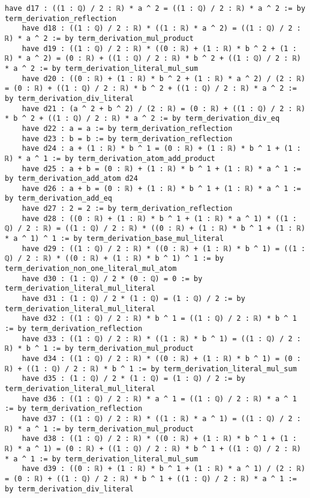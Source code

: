 \documentclass{article}
\begin{document}
\begin{tcolorbox}[colback=white!10, width=\linewidth]
\begin{lstlisting}[language=Lean4]
    have d17 : ((1 : ℚ) / 2 : ℝ) * a ^ 2 = ((1 : ℚ) / 2 : ℝ) * a ^ 2 := by term_derivation_reflection
    have d18 : ((1 : ℚ) / 2 : ℝ) * ((1 : ℝ) * a ^ 2) = ((1 : ℚ) / 2 : ℝ) * a ^ 2 := by term_derivation_mul_product
    have d19 : ((1 : ℚ) / 2 : ℝ) * ((0 : ℝ) + (1 : ℝ) * b ^ 2 + (1 : ℝ) * a ^ 2) = (0 : ℝ) + ((1 : ℚ) / 2 : ℝ) * b ^ 2 + ((1 : ℚ) / 2 : ℝ) * a ^ 2 := by term_derivation_literal_mul_sum
    have d20 : ((0 : ℝ) + (1 : ℝ) * b ^ 2 + (1 : ℝ) * a ^ 2) / (2 : ℝ) = (0 : ℝ) + ((1 : ℚ) / 2 : ℝ) * b ^ 2 + ((1 : ℚ) / 2 : ℝ) * a ^ 2 := by term_derivation_div_literal
    have d21 : (a ^ 2 + b ^ 2) / (2 : ℝ) = (0 : ℝ) + ((1 : ℚ) / 2 : ℝ) * b ^ 2 + ((1 : ℚ) / 2 : ℝ) * a ^ 2 := by term_derivation_div_eq
    have d22 : a = a := by term_derivation_reflection
    have d23 : b = b := by term_derivation_reflection
    have d24 : a + (1 : ℝ) * b ^ 1 = (0 : ℝ) + (1 : ℝ) * b ^ 1 + (1 : ℝ) * a ^ 1 := by term_derivation_atom_add_product
    have d25 : a + b = (0 : ℝ) + (1 : ℝ) * b ^ 1 + (1 : ℝ) * a ^ 1 := by term_derivation_add_atom d24
    have d26 : a + b = (0 : ℝ) + (1 : ℝ) * b ^ 1 + (1 : ℝ) * a ^ 1 := by term_derivation_add_eq
    have d27 : 2 = 2 := by term_derivation_reflection
    have d28 : ((0 : ℝ) + (1 : ℝ) * b ^ 1 + (1 : ℝ) * a ^ 1) * ((1 : ℚ) / 2 : ℝ) = ((1 : ℚ) / 2 : ℝ) * ((0 : ℝ) + (1 : ℝ) * b ^ 1 + (1 : ℝ) * a ^ 1) ^ 1 := by term_derivation_base_mul_literal
    have d29 : ((1 : ℚ) / 2 : ℝ) * ((0 : ℝ) + (1 : ℝ) * b ^ 1) = ((1 : ℚ) / 2 : ℝ) * ((0 : ℝ) + (1 : ℝ) * b ^ 1) ^ 1 := by term_derivation_non_one_literal_mul_atom
    have d30 : (1 : ℚ) / 2 * (0 : ℚ) = 0 := by term_derivation_literal_mul_literal
    have d31 : (1 : ℚ) / 2 * (1 : ℚ) = (1 : ℚ) / 2 := by term_derivation_literal_mul_literal
    have d32 : ((1 : ℚ) / 2 : ℝ) * b ^ 1 = ((1 : ℚ) / 2 : ℝ) * b ^ 1 := by term_derivation_reflection
    have d33 : ((1 : ℚ) / 2 : ℝ) * ((1 : ℝ) * b ^ 1) = ((1 : ℚ) / 2 : ℝ) * b ^ 1 := by term_derivation_mul_product
    have d34 : ((1 : ℚ) / 2 : ℝ) * ((0 : ℝ) + (1 : ℝ) * b ^ 1) = (0 : ℝ) + ((1 : ℚ) / 2 : ℝ) * b ^ 1 := by term_derivation_literal_mul_sum
    have d35 : (1 : ℚ) / 2 * (1 : ℚ) = (1 : ℚ) / 2 := by term_derivation_literal_mul_literal
    have d36 : ((1 : ℚ) / 2 : ℝ) * a ^ 1 = ((1 : ℚ) / 2 : ℝ) * a ^ 1 := by term_derivation_reflection
    have d37 : ((1 : ℚ) / 2 : ℝ) * ((1 : ℝ) * a ^ 1) = ((1 : ℚ) / 2 : ℝ) * a ^ 1 := by term_derivation_mul_product
    have d38 : ((1 : ℚ) / 2 : ℝ) * ((0 : ℝ) + (1 : ℝ) * b ^ 1 + (1 : ℝ) * a ^ 1) = (0 : ℝ) + ((1 : ℚ) / 2 : ℝ) * b ^ 1 + ((1 : ℚ) / 2 : ℝ) * a ^ 1 := by term_derivation_literal_mul_sum
    have d39 : ((0 : ℝ) + (1 : ℝ) * b ^ 1 + (1 : ℝ) * a ^ 1) / (2 : ℝ) = (0 : ℝ) + ((1 : ℚ) / 2 : ℝ) * b ^ 1 + ((1 : ℚ) / 2 : ℝ) * a ^ 1 := by term_derivation_div_literal

\end{lstlisting}
\end{tcolorbox}
\end{document}
